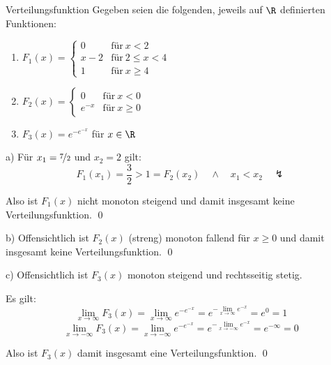 \begin{example}{Verteilungsfunktion}
    Gegeben seien die folgenden, jeweils auf $\R$ definierten Funktionen:
    \begin{enumerate}[\alph*)]
        \item $F_1(x) =
                  \begin{cases}
                      0   & \text{für} \ x < 2        \\
                      x-2 & \text{für} \ 2 \leq x < 4 \\
                      1   & \text{für} \ x \geq 4
                  \end{cases}
              $
        \item $F_2(x) =
                  \begin{cases}
                      0      & \text{für} \ x < 0    \\
                      e^{-x} & \text{für} \ x \geq 0
                  \end{cases}
              $
        \item $F_3(x) = e^{-e^{-x}}$ für $x \in \R$
    \end{enumerate}

    \exampleseparator

    a)  Für $x_1 = \nicefrac{7}{2}$ und $x_2 = 2$ gilt:
    \[
        F_1(x_1) = \frac{3}{2} > 1 = F_2(x_2) \quad \land \quad x_1 < x_2 \quad \lightning
    \]

    Also ist $F_1(x)$ nicht monoton steigend und damit insgesamt keine Verteilungsfunktion.
    \qed

    b) Offensichtlich ist $F_2(x)$ (streng) monoton fallend für $x \geq 0$ und damit insgesamt keine Verteilungsfunktion.
    \qed

    c) Offensichtlich ist $F_3(x)$ monoton steigend und rechtsseitig stetig.

    Es gilt:
    \[
        \lim_{x \to \infty} F_3(x) = \lim_{x \to \infty} e^{-e^{-x}} = e^{- \lim_{x \to \infty} e^{-x}} = e^{0} = 1
    \]
    \[
        \lim_{x \to -\infty} F_3(x) = \lim_{x \to -\infty} e^{-e^{-x}} = e^{- \lim_{x \to -\infty} e^{-x}} = e^{-\infty} = 0
    \]

    Also ist $F_3(x)$ damit insgesamt eine Verteilungsfunktion.
    \qed
\end{example}

